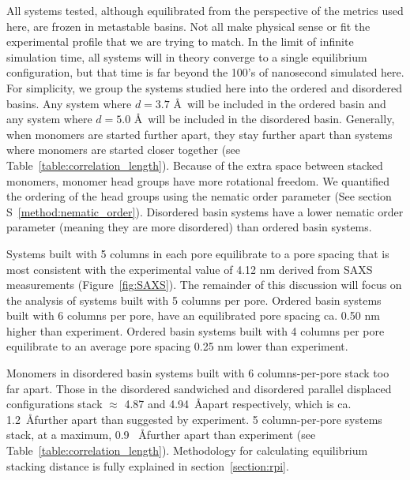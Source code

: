 \documentclass[journal=jpcbfk,manuscript=article]{achemso}
\begin{document}
  All systems tested, although equilibrated from the perspective of the metrics used here, are
  frozen in metastable basins. Not all make physical sense or fit the experimental profile that 
  we are trying to match. In the limit of infinite simulation time, all systems will in theory 
  converge to a single equilibrium configuration, but that time is far beyond the 100's of 
  nanosecond simulated here. For simplicity, we group the systems studied here into the ordered
  and disordered basins. Any system where $\mathit{d}=3.7$ \AA~will be included in the
  ordered basin and any system where $\mathit{d}=5.0$ \AA~will be included in the disordered basin.
  Generally, when monomers are started further apart, they stay further apart than systems where
  monomers are started closer together (see Table~\ref{table:correlation_length}). Because of the
  extra space between stacked monomers, monomer head groups have more rotational freedom. We
  quantified the ordering of the head groups using the nematic order parameter (See section S~\ref{method:nematic_order}). 
  Disordered basin systems have a lower nematic order parameter (meaning they are more disordered) 
  than ordered basin systems.

  
  Systems built with 5 columns in each pore equilibrate to a pore spacing that is most 
  consistent with the experimental value of 4.12 nm derived from SAXS measurements 
  (Figure~\ref{fig:SAXS}). The remainder of this discussion will focus on the analysis of
  systems built with 5 columns per pore. Ordered basin systems built with 6 columns per pore,
  have an equilibrated pore spacing ca. 0.50 nm higher than experiment. Ordered basin systems
  built with 4 columns per pore equilibrate to an average pore spacing 0.25 nm lower than experiment. 
  
  Monomers in disordered basin systems built with 6 columns-per-pore stack too far apart.
  Those in the disordered sandwiched and disordered parallel displaced configurations stack 
  $\approx$ 4.87 and 4.94~\AA apart respectively, which is ca. 1.2~\AA further apart than 
  suggested by experiment. 5 column-per-pore systems stack, at a maximum, 0.9 ~\AA further
  apart than experiment (see Table~\ref{table:correlation_length}). Methodology for calculating
  equilibrium stacking distance is fully explained in section~\ref{section:rpi}.
  
\end{document}

